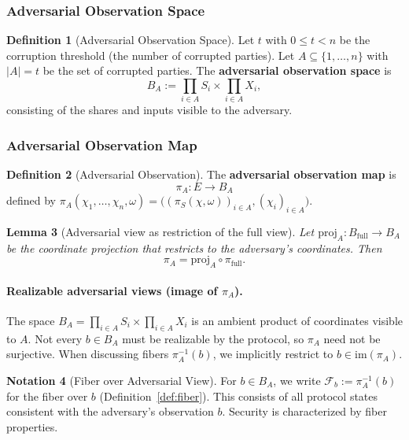 \documentclass[11pt,a4paper]{article}
\theoremstyle{definition}
\newtheorem{definition}{Definition}[section]
\newtheorem{notation}[definition]{Notation}
\theoremstyle{plain}
\newtheorem{lemma}[definition]{Lemma}
\newcommand{\cF}{\mathcal{F}}
\begin{document}
\subsubsection{Adversarial Observation Space}
\begin{definition}[Adversarial Observation Space]
Let $t$ with $0 \leq t < n$ be the corruption threshold (the number of corrupted parties). Let $A \subseteq \{1, \ldots, n\}$ with $|A| = t$ be the set of corrupted parties. The \textbf{adversarial observation space} is
\[
B_A := \prod_{i \in A} S_i \times \prod_{i \in A} X_i,
\]
consisting of the shares and inputs visible to the adversary.
\end{definition}

\subsubsection{Adversarial Observation Map}
\begin{definition}[Adversarial Observation]
\label{def:adv-fibration}
The \textbf{adversarial observation map} is
\[
\pi_A: E \longrightarrow B_A
\]
defined by $\pi_A(\chi_1, \ldots, \chi_n, \omega) = \bigl( (\pi_S(\chi, \omega))_{i \in A}, (\chi_i)_{i \in A} \bigr)$.
\end{definition}

\begin{lemma}[Adversarial view as restriction of the full view]
\label{lem:adv-as-restriction}
Let $\mathrm{proj}_A: B_{\mathrm{full}} \to B_A$ be the coordinate projection that restricts to the adversary's coordinates. Then
\[
\pi_A = \mathrm{proj}_A \circ \pi_{\mathrm{full}}.
\]
\end{lemma}

\paragraph{Realizable adversarial views (image of $\pi_A$).}
The space $B_A = \prod_{i \in A} S_i \times \prod_{i \in A} X_i$ is an ambient product of coordinates visible to $A$.
Not every $b\in B_A$ must be realizable by the protocol, so $\pi_A$ need not be surjective.
When discussing fibers $\pi_A^{-1}(b)$, we implicitly restrict to $b\in \mathrm{im}(\pi_A)$.

\begin{notation}[Fiber over Adversarial View]
For $b \in B_A$, we write $\cF_b := \pi_A^{-1}(b)$ for the fiber over $b$ (Definition~\ref{def:fiber}). This consists of all protocol states consistent with the adversary's observation $b$. Security is characterized by fiber properties.
\end{notation}
\end{document}
